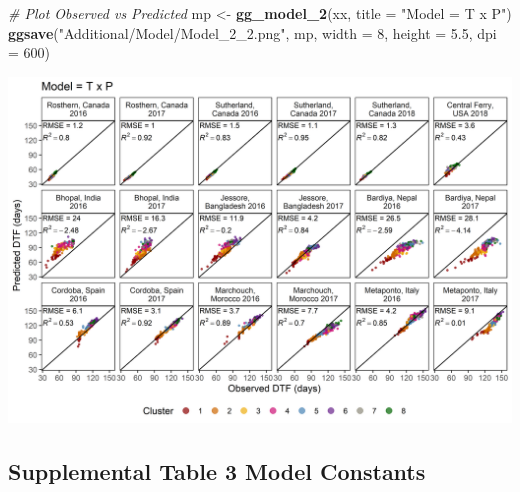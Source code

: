 \documentclass[
]{article}
\newenvironment{Shaded}{\begin{snugshade}}{\end{snugshade}}
\newcommand{\CommentTok}[1]{\textcolor[rgb]{0.56,0.35,0.01}{\textit{#1}}}
\newcommand{\DataTypeTok}[1]{\textcolor[rgb]{0.13,0.29,0.53}{#1}}
\newcommand{\DecValTok}[1]{\textcolor[rgb]{0.00,0.00,0.81}{#1}}
\newcommand{\FloatTok}[1]{\textcolor[rgb]{0.00,0.00,0.81}{#1}}
\newcommand{\KeywordTok}[1]{\textcolor[rgb]{0.13,0.29,0.53}{\textbf{#1}}}
\newcommand{\NormalTok}[1]{#1}
\newcommand{\OperatorTok}[1]{\textcolor[rgb]{0.81,0.36,0.00}{\textbf{#1}}}
\newcommand{\StringTok}[1]{\textcolor[rgb]{0.31,0.60,0.02}{#1}}
\begin{document}
\begin{Shaded}
\begin{Highlighting}[]
\CommentTok{# Plot Observed vs Predicted}
\NormalTok{mp <-}\StringTok{ }\KeywordTok{gg_model_2}\NormalTok{(xx, }\DataTypeTok{title =} \StringTok{"Model = T x P"}\NormalTok{)}
\KeywordTok{ggsave}\NormalTok{(}\StringTok{"Additional/Model/Model_2_2.png"}\NormalTok{, mp, }\DataTypeTok{width =} \DecValTok{8}\NormalTok{, }\DataTypeTok{height =} \FloatTok{5.5}\NormalTok{, }\DataTypeTok{dpi =} \DecValTok{600}\NormalTok{)}
\end{Highlighting}
\end{Shaded}

\includegraphics{Additional/Model/Model_2_2.png}

\hypertarget{supplemental-table-3-model-constants}{%
\subsection{Supplemental Table 3 Model
Constants}\label{supplemental-table-3-model-constants}}

\begin{Shaded}
\end{Shaded}
\end{document}
